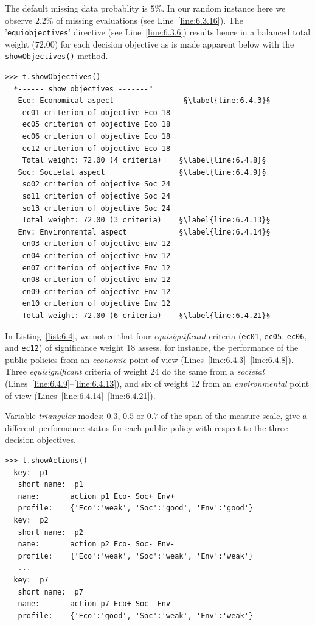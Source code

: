 The default missing data probablity is $5\%$. In our random instance here we observe $2.2\%$ of missing evaluations (see Line~\ref{line:6.3.16}). The '\texttt{equiobjectives}' directive (see Line~\ref{line:6.3.6}) results hence in a balanced total weight ($72.00$) for each decision objective  as is made apparent below with the \texttt{showObjectives()} method.
\begin{lstlisting}[caption={Inspecting the three objectives},label=list:6.4]
>>> t.showObjectives()
  *------ show objectives -------"
   Eco: Economical aspect                §\label{line:6.4.3}§
    ec01 criterion of objective Eco 18
    ec05 criterion of objective Eco 18
    ec06 criterion of objective Eco 18
    ec12 criterion of objective Eco 18  
    Total weight: 72.00 (4 criteria)    §\label{line:6.4.8}§
   Soc: Societal aspect                 §\label{line:6.4.9}§
    so02 criterion of objective Soc 24
    so11 criterion of objective Soc 24
    so13 criterion of objective Soc 24
    Total weight: 72.00 (3 criteria)    §\label{line:6.4.13}§
   Env: Environmental aspect            §\label{line:6.4.14}§
    en03 criterion of objective Env 12
    en04 criterion of objective Env 12
    en07 criterion of objective Env 12
    en08 criterion of objective Env 12
    en09 criterion of objective Env 12
    en10 criterion of objective Env 12
    Total weight: 72.00 (6 criteria)    §\label{line:6.4.21}§
\end{lstlisting}

In Listing~\vref{list:6.4}, we notice that four \emph{equisignificant} criteria (\texttt{ec01}, \texttt{ec05}, \texttt{ec06}, and \texttt{ec12}) of significance weight 18 assess, for instance, the performance of the public policies from an \emph{economic} point of view (Lines~\ref{line:6.4.3}--\ref{line:6.4.8}). Three \emph{equisignificant} criteria of weight 24 do the same from a \emph{societal} (Lines~\ref{line:6.4.9}--\ref{line:6.4.13}), and six of weight 12 from an \emph{environmental} point of view (Lines~\ref{line:6.4.14}--\ref{line:6.4.21}). 

Variable \emph{triangular} modes: $0.3$, $0.5$ or $0.7$ of the span of the measure scale, give a different performance status for each public policy with respect to the three decision objectives.
\begin{lstlisting}
>>> t.showActions()
  key:  p1
   short name:  p1
   name:       action p1 Eco- Soc+ Env+
   profile:    {'Eco':'weak', 'Soc':'good', 'Env':'good'}
  key:  p2
   short name:  p2
   name:       action p2 Eco- Soc- Env-
   profile:    {'Eco':'weak', 'Soc':'weak', 'Env':'weak'}
   ...
  key:  p7
   short name:  p7
   name:       action p7 Eco+ Soc- Env-
   profile:    {'Eco':'good', 'Soc':'weak', 'Env':'weak'}
\end{lstlisting}


